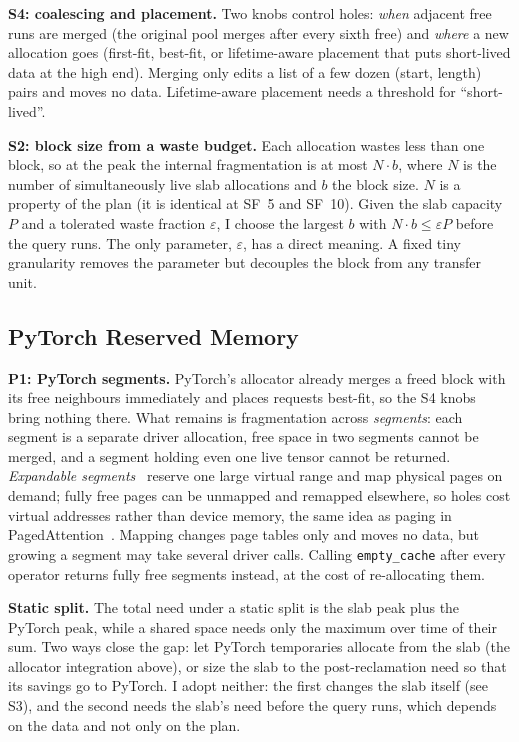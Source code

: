 \documentclass[10pt,twocolumn,letterpaper]{article}
\newcommand{\code}[1]{\texttt{\small #1}}
\begin{document}
\textbf{S4: coalescing and placement.} Two knobs control holes: \emph{when} adjacent free
runs are merged (the original pool merges after every sixth free) and \emph{where} a new
allocation goes (first-fit, best-fit, or lifetime-aware placement that puts short-lived
data at the high end). Merging only edits a list of a few dozen (start, length) pairs and
moves no data. Lifetime-aware placement needs a threshold for ``short-lived''.

\textbf{S2: block size from a waste budget.} Each allocation wastes less than one block,
so at the peak the internal fragmentation is at most $N\cdot b$, where $N$ is the number of
simultaneously live slab allocations and $b$ the block size. $N$ is a property of the plan
(it is identical at SF~5 and SF~10). Given the slab capacity $P$ and a tolerated waste
fraction $\varepsilon$, I choose the largest $b$ with $N\cdot b \le \varepsilon P$ before
the query runs. The only parameter, $\varepsilon$, has a direct meaning. A fixed tiny
granularity removes the parameter but decouples the block from any transfer unit.

\subsection{PyTorch Reserved Memory}
\textbf{P1: PyTorch segments.} PyTorch's allocator already merges a freed block with its free
neighbours immediately and places requests best-fit, so the S4 knobs bring nothing there.
What remains is fragmentation across \emph{segments}: each segment is a separate driver
allocation, free space in two segments cannot be merged, and a segment holding even one
live tensor cannot be returned.
\emph{Expandable segments}~\cite{pytorchmem} reserve one large virtual range and map
physical pages on demand; fully free pages can be unmapped and remapped elsewhere, so
holes cost virtual addresses rather than device memory, the same idea as paging in
PagedAttention~\cite{kwon2023paged}. Mapping changes page tables only and moves no data,
but growing a segment may take several driver calls. Calling \code{empty\_cache} after
every operator returns fully free segments instead, at the cost of re-allocating them.

\textbf{Static split.} The total need under a static split is the slab peak plus the
PyTorch peak, while a shared space needs only the maximum over time of their sum.
Two ways close the gap: let PyTorch temporaries allocate from the slab (the allocator
integration above), or size the slab to the post-reclamation need so that its savings
go to PyTorch. I adopt neither: the first changes the slab itself (see S3), and the second
needs the slab's need before the query runs, which depends on the data and not only on the
plan.
\end{document}
